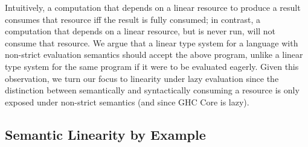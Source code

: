\documentclass[acmsmall,review,anonymous,screen]{acmart}
\begin{document}
%
Intuitively, a computation that depends on a linear resource to produce a
result consumes that resource iff the result is fully consumed; in
contrast, a computation that depends on a linear resource, but is never run,
will not consume that resource.
%
We argue that a linear type system for a language with non-strict evaluation
semantics should accept the above program, unlike a linear type system for the
same program if it were to be evaluated eagerly.
%
Given this observation, %
%
we turn our focus to linearity under lazy evaluation since the distinction between semantically and syntactically
consuming a resource is only exposed under non-strict semantics (and since GHC Core is
lazy).



% 
% 
% 

\subsection{Semantic Linearity by Example\label{sec:semantic-linearity-examples}}
\end{document}
